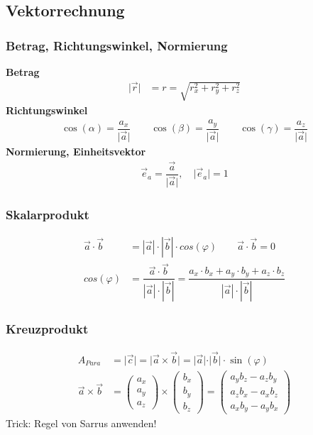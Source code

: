 \subsection{Vektorrechnung}
\subsubsection{Betrag, Richtungswinkel, Normierung}
\textbf{Betrag}
\begin{align*}
	\vert \vec{r}  \vert & = r = \sqrt{r^2_x + r^2_y + r^2_z}
\end{align*}
\textbf{Richtungswinkel}
\begin{align*}
	\cos(\alpha) = \dfrac{a_x}{\vert \vec{a} \vert} \qquad \cos(\beta) = \dfrac{a_y}{\vert \vec{a} \vert} \qquad
	\cos(\gamma) = \dfrac{a_z}{\vert \vec{a} \vert}
\end{align*}
\textbf{Normierung, Einheitsvektor}
\begin{align*}
	\vec{e}_a =  \dfrac{\vec{a}}{\vert \vec{a} \vert}, \quad \vert \vec{e}_a \vert = 1
\end{align*}

\subsubsection{Skalarprodukt}
\begin{align*}
	\vec{a} \cdot \vec{b} & = |\vec{a}| \cdot |\vec{b}| \cdot cos(\varphi) \qquad \vec{a} \cdot \vec{b}  = 0                                                              \\
	cos(\varphi)          & = \dfrac{\vec{a} \cdot \vec{b}}{|\vec{a}| \cdot |\vec{b}|} = \dfrac{a_x \cdot b_x + a_y \cdot b_y + a_z \cdot b_z}{|\vec{a}| \cdot |\vec{b}|}
\end{align*}

\subsubsection{Kreuzprodukt}

\begingroup
\renewcommand*{\arraystretch}{.95}
\begin{align*}
	A_{Para}             & = \vert \vec{c} \vert = \vert \vec{a} \times \vec{b} \vert = \vert \vec{a} \vert \cdot \vert \vec{b} \vert \cdot \sin(\varphi) \\
	\vec{a}\times\vec{b} & =
	\begin{pmatrix}
		a_x \\
		a_y \\
		a_z
	\end{pmatrix}
	\times
	\begin{pmatrix}
		b_x \\
		b_y \\
		b_z
	\end{pmatrix} =
	\begin{pmatrix}
		a_yb_z-a_zb_y \\
		a_zb_x-a_xb_z \\
		a_xb_y-a_yb_x
	\end{pmatrix}
\end{align*}
\endgroup
Trick: Regel von Sarrus anwenden!

